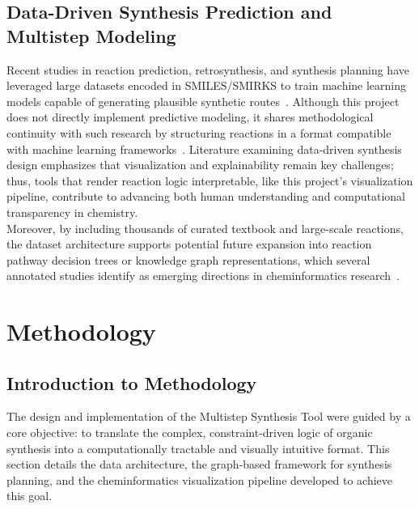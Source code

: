 \documentclass[12pt]{article}
\begin{document}
\subsection{Data-Driven Synthesis Prediction and Multistep Modeling}
\indent
Recent studies in reaction prediction, retrosynthesis, and synthesis planning have leveraged large datasets encoded in SMILES/SMIRKS to train machine learning models capable of generating plausible synthetic routes~\cite{dai2019retrosynthesis}.
Although this project does not directly implement predictive modeling, it shares methodological continuity with such research by structuring reactions in a format compatible with machine learning frameworks~\cite{hormazabal2022cede}.
Literature examining data-driven synthesis design emphasizes that visualization and explainability remain key challenges; thus, tools that render reaction logic interpretable, like this project’s visualization pipeline, contribute to advancing both human understanding and computational transparency in chemistry.
\\
\indent
Moreover, by including thousands of curated textbook and large-scale reactions, the dataset architecture supports potential future expansion into reaction pathway decision trees or knowledge graph representations, which several annotated studies identify as emerging directions in cheminformatics research~\cite{10.1016/j.tcs.2025.115344}.

\section{Methodology}
\subsection{Introduction to Methodology}
The design and implementation of the Multistep Synthesis Tool were guided by a core objective: to translate the complex, constraint-driven logic of organic synthesis into a computationally tractable and visually intuitive format.
This section details the data architecture, the graph-based framework for synthesis planning, and the cheminformatics visualization pipeline developed to achieve this goal.
\end{document}
